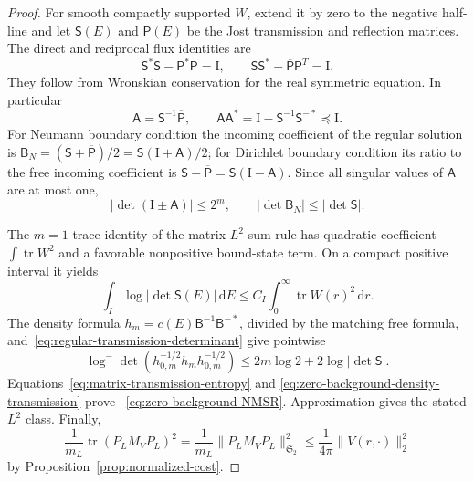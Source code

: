 \documentclass[11pt]{article}
\newcommand{\HS}{\mathfrak S_2}
\newcommand{\Id}{\mathrm I}
\newcommand{\dd}{\,\mathrm d}
\DeclareMathOperator{\tr}{tr}
\theoremstyle{definition}
\theoremstyle{remark}
\begin{document}
\begin{proof}
For smooth compactly supported $W$, extend it by zero to the negative
half-line and let $\mathsf S(E)$ and $\mathsf P(E)$ be the Jost transmission
and reflection matrices.  The direct and reciprocal flux identities are
\begin{equation}
 \mathsf S^*\mathsf S-\mathsf P^*\mathsf P=\Id,
 \qquad
 \mathsf S\mathsf S^*-\overline{\mathsf P}\mathsf P^T=\Id.
 \label{eq:matrix-flux-transmission}
\end{equation}
They follow from Wronskian conservation for the real symmetric equation.  In
particular
\begin{equation}
 \mathsf A=\mathsf S^{-1}\overline{\mathsf P},
 \qquad
 \mathsf A\mathsf A^*
 =\Id-\mathsf S^{-1}\mathsf S^{-*}\preceq\Id.
 \label{eq:reflection-contraction}
\end{equation}
For Neumann boundary condition the incoming coefficient of the regular
solution is
$\mathsf B_N=(\mathsf S+\overline{\mathsf P})/2
=\mathsf S(\Id+\mathsf A)/2$; for Dirichlet boundary condition its ratio to
the free incoming coefficient is
$\mathsf S-\overline{\mathsf P}=\mathsf S(\Id-\mathsf A)$.
Since all singular values of $\mathsf A$ are at most one,
\begin{equation}
 |\det(\Id\mathbin\pm\mathsf A)|\leq2^m,
 \qquad
 |\det\mathsf B_N|\leq|\det\mathsf S|.
 \label{eq:regular-transmission-determinant}
\end{equation}

The $m=1$ trace identity of the matrix $L^2$ sum rule
\cite[Theorem~7]{MolchanovVainberg2004} has quadratic coefficient
$\int\tr W^2$ and a favorable nonpositive bound-state term.  On a compact
positive interval it yields
\begin{equation}
 \int_I\log|\det\mathsf S(E)|\dd E
 \leq C_I\int_0^\infty\tr W(r)^2\dd r.
 \label{eq:matrix-transmission-entropy}
\end{equation}
The density formula
$h_m=c(E)\mathsf B^{-1}\mathsf B^{-*}$, divided by the matching free formula,
and~\eqref{eq:regular-transmission-determinant} give pointwise
\begin{equation}
 \log^-\det(h_{0,m}^{-1/2}h_mh_{0,m}^{-1/2})
 \leq 2m\log2+2\log|\det\mathsf S|.
 \label{eq:zero-background-density-transmission}
\end{equation}
Equations~\eqref{eq:matrix-transmission-entropy} and
\eqref{eq:zero-background-density-transmission} prove
~\eqref{eq:zero-background-NMSR}.  Approximation gives the stated $L^2$
class.  Finally,
\begin{equation}
 \frac1{m_L}\tr(P_LM_VP_L)^2
 =\frac1{m_L}\|P_LM_VP_L\|_{\HS}^2
 \leq\frac1{4\pi}\|V(r,\cdot)\|_2^2
\end{equation}
by Proposition~\ref{prop:normalized-cost}.
\end{proof}
\end{document}
